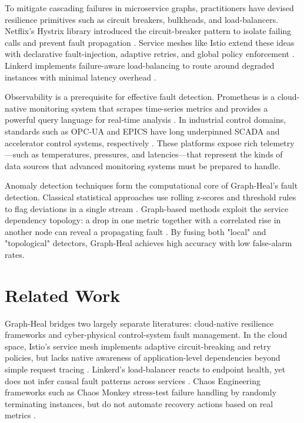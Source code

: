 \documentclass[11pt,conference]{IEEEtran}
\begin{document}
To mitigate cascading failures in microservice graphs, practitioners have devised resilience primitives such as circuit breakers, bulkheads, and load-balancers.  Netflix's Hystrix library introduced the circuit-breaker pattern to isolate failing calls and prevent fault propagation \cite{DAlessandro2012}.  Service meshes like Istio extend these ideas with declarative fault-injection, adaptive retries, and global policy enforcement \cite{Morgan2017}.  Linkerd implements failure-aware load-balancing to route around degraded instances with minimal latency overhead \cite{Sigelman2016}.

Observability is a prerequisite for effective fault detection.  Prometheus is a cloud-native monitoring system that scrapes time-series metrics and provides a powerful query language for real-time analysis \cite{ReinartzVolz2018}.  In industrial control domains, standards such as OPC-UA and EPICS have long underpinned SCADA and accelerator control systems, respectively \cite{OPCFoundation2015, Dalesio1993}.  These platforms expose rich telemetry—such as temperatures, pressures, and latencies—that represent the kinds of data sources that advanced monitoring systems must be prepared to handle.

Anomaly detection techniques form the computational core of Graph-Heal's fault detection.  Classical statistical approaches use rolling z-scores and threshold rules to flag deviations in a single stream \cite{Chandola2009}.  Graph-based methods exploit the service dependency topology: a drop in one metric together with a correlated rise in another node can reveal a propagating fault \cite{PengWilkes2004}.  By fusing both "local" and "topological" detectors, Graph-Heal achieves high accuracy with low false-alarm rates.

\section{Related Work}

Graph-Heal bridges two largely separate literatures: cloud-native resilience frameworks and cyber-physical control-system fault management.  In the cloud space, Istio's service mesh implements adaptive circuit-breaking and retry policies, but lacks native awareness of application-level dependencies beyond simple request tracing \cite{Morgan2017}.  Linkerd's load-balancer reacts to endpoint health, yet does not infer causal fault patterns across services \cite{Sigelman2016}.  Chaos Engineering frameworks such as Chaos Monkey stress-test failure handling by randomly terminating instances, but do not automate recovery actions based on real metrics \cite{Basiri2017}.
\end{document}
